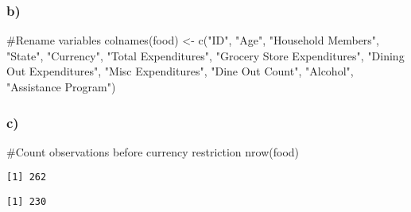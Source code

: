 \documentclass[
  letterpaper,
  DIV=11,
  numbers=noendperiod]{scrartcl}
\newenvironment{Shaded}{\begin{snugshade}}{\end{snugshade}}
\newcommand{\CommentTok}[1]{\textcolor[rgb]{0.37,0.37,0.37}{#1}}
\newcommand{\FunctionTok}[1]{\textcolor[rgb]{0.28,0.35,0.67}{#1}}
\newcommand{\NormalTok}[1]{\textcolor[rgb]{0.00,0.23,0.31}{#1}}
\newcommand{\OtherTok}[1]{\textcolor[rgb]{0.00,0.23,0.31}{#1}}
\newcommand{\SpecialCharTok}[1]{\textcolor[rgb]{0.37,0.37,0.37}{#1}}
\newcommand{\StringTok}[1]{\textcolor[rgb]{0.13,0.47,0.30}{#1}}
\begin{document}
\subsubsection{b)}\label{b-1}

\begin{Shaded}
\begin{Highlighting}[]
\CommentTok{\#Rename variables}
\FunctionTok{colnames}\NormalTok{(food) }\OtherTok{\textless{}{-}} \FunctionTok{c}\NormalTok{(}\StringTok{"ID"}\NormalTok{, }\StringTok{"Age"}\NormalTok{, }\StringTok{"Household Members"}\NormalTok{, }\StringTok{"State"}\NormalTok{, }\StringTok{"Currency"}\NormalTok{, }\StringTok{"Total Expenditures"}\NormalTok{, }\StringTok{"Grocery Store Expenditures"}\NormalTok{, }\StringTok{"Dining Out Expenditures"}\NormalTok{, }\StringTok{"Misc Expenditures"}\NormalTok{, }\StringTok{"Dine Out Count"}\NormalTok{, }\StringTok{"Alcohol"}\NormalTok{, }\StringTok{"Assistance Program"}\NormalTok{)}
\end{Highlighting}
\end{Shaded}

\subsubsection{c)}\label{c}

\begin{Shaded}
\begin{Highlighting}[]
\CommentTok{\#Count observations before currency restriction}
\FunctionTok{nrow}\NormalTok{(food)}
\end{Highlighting}
\end{Shaded}

\begin{verbatim}
[1] 262
\end{verbatim}

\begin{Shaded}
\end{Shaded}

\begin{verbatim}
[1] 230
\end{verbatim}
\end{document}
